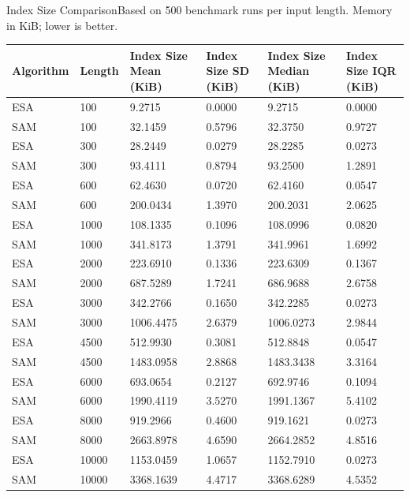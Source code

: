 \begin{benchmarktable}{Index Size Comparison}{Based on 500 benchmark runs per input length. Memory in KiB; lower is better.}
\begin{tabularx}{\textwidth}{|X|X|X|X|X|X|}
\toprule
Algorithm & Length & Index Size Mean (KiB) & Index Size SD (KiB) & Index Size Median (KiB) & Index Size IQR (KiB) \\
\midrule
ESA & 100 & 9.2715 & 0.0000 & 9.2715 & 0.0000 \\
SAM & 100 & 32.1459 & 0.5796 & 32.3750 & 0.9727 \\
\hline
ESA & 300 & 28.2449 & 0.0279 & 28.2285 & 0.0273 \\
SAM & 300 & 93.4111 & 0.8794 & 93.2500 & 1.2891 \\
\hline
ESA & 600 & 62.4630 & 0.0720 & 62.4160 & 0.0547 \\
SAM & 600 & 200.0434 & 1.3970 & 200.2031 & 2.0625 \\
\hline
ESA & 1000 & 108.1335 & 0.1096 & 108.0996 & 0.0820 \\
SAM & 1000 & 341.8173 & 1.3791 & 341.9961 & 1.6992 \\
\hline
ESA & 2000 & 223.6910 & 0.1336 & 223.6309 & 0.1367 \\
SAM & 2000 & 687.5289 & 1.7241 & 686.9688 & 2.6758 \\
\hline
ESA & 3000 & 342.2766 & 0.1650 & 342.2285 & 0.0273 \\
SAM & 3000 & 1006.4475 & 2.6379 & 1006.0273 & 2.9844 \\
\hline
ESA & 4500 & 512.9930 & 0.3081 & 512.8848 & 0.0547 \\
SAM & 4500 & 1483.0958 & 2.8868 & 1483.3438 & 3.3164 \\
\hline
ESA & 6000 & 693.0654 & 0.2127 & 692.9746 & 0.1094 \\
SAM & 6000 & 1990.4119 & 3.5270 & 1991.1367 & 5.4102 \\
\hline
ESA & 8000 & 919.2966 & 0.4600 & 919.1621 & 0.0273 \\
SAM & 8000 & 2663.8978 & 4.6590 & 2664.2852 & 4.8516 \\
\hline
ESA & 10000 & 1153.0459 & 1.0657 & 1152.7910 & 0.0273 \\
SAM & 10000 & 3368.1639 & 4.4717 & 3368.6289 & 4.5352 \\
\bottomrule
\end{tabularx}
\end{benchmarktable}